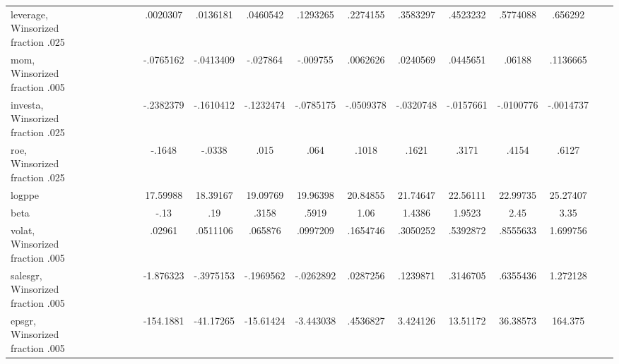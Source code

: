 \begin{table}[htbp]
\begin{tabular}{l*{1}{ccccccccccccccccc}}
leverage, Winsorized fraction .025&            &            &            &            &            &            &    .0020307&    .0136181&    .0460542&    .1293265&    .2274155&    .3583297&    .4523232&    .5774088&     .656292&            &            \\
mom, Winsorized fraction .005&            &            &            &            &            &            &   -.0765162&   -.0413409&    -.027864&    -.009755&    .0062626&    .0240569&    .0445651&      .06188&    .1136665&            &            \\
investa, Winsorized fraction .025&            &            &            &            &            &            &   -.2382379&   -.1610412&   -.1232474&   -.0785175&   -.0509378&   -.0320748&   -.0157661&   -.0100776&   -.0014737&            &            \\
roe, Winsorized fraction .025&            &            &            &            &            &            &      -.1648&      -.0338&        .015&        .064&       .1018&       .1621&       .3171&       .4154&       .6127&            &            \\
logppe              &            &            &            &            &            &            &    17.59988&    18.39167&    19.09769&    19.96398&    20.84855&    21.74647&    22.56111&    22.99735&    25.27407&            &            \\
beta                &            &            &            &            &            &            &        -.13&         .19&       .3158&       .5919&        1.06&      1.4386&      1.9523&        2.45&        3.35&            &            \\
volat, Winsorized fraction .005&            &            &            &            &            &            &      .02961&    .0511106&     .065876&    .0997209&    .1654746&    .3050252&    .5392872&    .8555633&    1.699756&            &            \\
salesgr, Winsorized fraction .005&            &            &            &            &            &            &   -1.876323&   -.3975153&   -.1969562&   -.0262892&    .0287256&    .1239871&    .3146705&    .6355436&    1.272128&            &            \\
epsgr, Winsorized fraction .005&            &            &            &            &            &            &   -154.1881&   -41.17265&   -15.61424&   -3.443038&    .4536827&    3.424126&    13.51172&    36.38573&     164.375&            &            \\
\bottomrule
\end{tabular}
\end{table}
